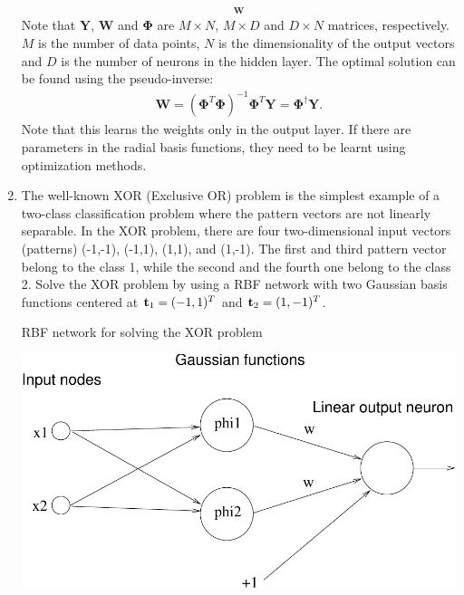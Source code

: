 \begin{enumerate}
\begin{solution}
\begin{align*}
{      }_{\mathbf{W}}
    \end{align*}
    Note that $\mathbf{Y}$, $\mathbf{W}$ and $\mathbf{\Phi}$ are $M
    \times N$, $M \times D$ and $D \times N$ matrices, respectively.
    $M$ is the number of data points, $N$ is the dimensionality of the
    output vectors and $D$ is the number of neurons in the hidden
    layer.  The optimal solution can be found using the
    pseudo-inverse:
    \begin{align*}
      \mathbf{W} = (\mathbf{\Phi}^T\mathbf{\Phi})^{-1} \mathbf{\Phi}^T
      \mathbf{Y} = \mathbf{\Phi}^{\dagger} \mathbf{Y}.
    \end{align*}
    Note that this learns the weights only in the output layer.  If
    there are parameters in the radial basis functions, they need to
    be learnt using optimization methods.

  \end{solution}


\item The well-known XOR (Exclusive OR) problem is the simplest example of a
  two-class classification problem where the pattern vectors are not linearly
  separable. In the XOR problem, there are four two-dimensional input vectors
  (patterns) (-1,-1), (-1,1), (1,1), and (1,-1). The first and third pattern
  vector belong to the class 1, while the second and the fourth one belong
  to the class 2. Solve the XOR problem by using a RBF network with two
  Gaussian basis functions centered at ${\bf t}_1 = (-1,1)^T$ and
  ${\bf t}_2 = (1,-1)^T$.

  \begin{solution}

    RBF network for solving the XOR problem

    \begin{center}
      \includegraphics[scale=0.7]{v102-f1}
    \end{center}


\end{solution}
\end{enumerate}
